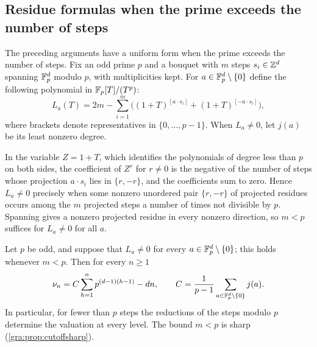 \subsection{Residue formulas when the prime exceeds the number of steps}\label{gra:sec:moments}
{\raggedright
{}
}

The preceding arguments have a uniform form when the prime exceeds the
number of steps. Fix an odd prime $p$ and a bouquet with $m$ steps
$s_i\in\mathbb{Z}^d$ spanning $\mathbb{F}_p^d$ modulo $p$, with multiplicities kept. For
$a\in\mathbb{F}_p^d\setminus\{0\}$ define the following polynomial in
$\mathbb{F}_p[T]/(T^p)$:
\[
 L_a(T)=2m-\sum_{i=1}^m
 \bigl((1+T)^{[a\cdot s_i]}+(1+T)^{[-a\cdot s_i]}\bigr),
\]
where brackets denote representatives in $\{0,\dots,p-1\}$. When
$L_a\ne0$, let $j(a)$ be its least nonzero degree.

In the variable $Z=1+T$, which identifies the polynomials of degree less
than $p$ on both sides, the coefficient of $Z^r$ for $r\ne0$ is the
negative of the number of steps whose projection $a\cdot s_i$ lies in
$\{r,-r\}$, and the coefficients sum to zero. Hence $L_a\ne0$ precisely
when some nonzero unordered pair $\{r,-r\}$ of projected residues occurs
among the $m$ projected steps a number of times not divisible by $p$.
Spanning gives a nonzero projected residue in every nonzero direction, so
$m<p$ suffices for $L_a\ne0$ for all $a$.

\begin{theorem}\label{gra:thm:cutoff}
Let $p$ be odd, and suppose that $L_a\ne0$ for every
$a\in\mathbb{F}_p^d\setminus\{0\}$; this holds whenever $m<p$. Then for every
$n\ge1$
\[
 \nu_n=C\sum_{h=1}^np^{(d-1)(h-1)}-dn,\qquad
 C=\frac1{p-1}\sum_{a\in\mathbb{F}_p^d\setminus\{0\}}j(a).
\]
In particular, for fewer than $p$ steps the reductions of the steps modulo
$p$ determine the valuation at every level. The bound $m<p$ is sharp
(\cref{gra:prop:cutoffsharp}).
\end{theorem}

